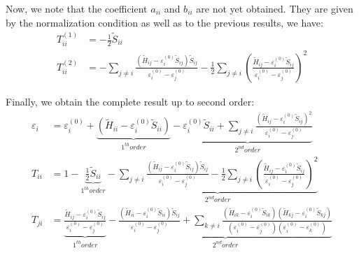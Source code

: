 \documentclass{article}
\newcommand{\order}[2]{#1^{(#2)}}
\begin{document}
Now, we note that the coefficient $a_{ii}$ and $b_{ii}$ are not yet obtained. They are given by the normalization condition as well as to the previous results, we have:
\begin{align}
    \order{T_{ii}}{1} &= - \frac{1}{2} \tilde{S}_{ii} \\ 
    \order{T_{ii}}{2} &= 
    - \sum_{j\neq i} \frac{(\tilde{H}_{ij} - \order{\varepsilon_i}{0}\tilde{S}_{ij})\tilde{S}_{ij}}{\order{\varepsilon_i}{0} - \order{\varepsilon_j}{0}}
    - \frac{1}{2} \sum_{j\neq i} \left(\frac{\tilde{H}_{ij} - \order{\varepsilon_i}{0}\tilde{S}_{ij}}{\order{\varepsilon_i}{0} - \order{\varepsilon_j}{0}} \right)^2
\end{align}

Finally, we obtain the complete result up to second order:
\begin{align}
    \varepsilon_i &= \order{\varepsilon_i}{0} + \underbrace{(\tilde{H}_{ii} - \order{\varepsilon_i}{0} \tilde{S}_{ii})}_{1^{th} order} 
    - \underbrace{\order{\varepsilon_i}{0} \tilde{S}_{ii} + \sum_{j\neq i} \frac{(\tilde{H}_{ij}- \order{\varepsilon_i}{0} \tilde{S}_{ij})^2}{\order{\varepsilon_i}{0} - \order{\varepsilon_j}{0}} }_{2^{nd} order}  \\ 
    T_{ii} &= 1 - \underbrace{\frac{1}{2} \tilde{S}_{ii}}_{1^{th} order} - \underbrace{\sum_{j\neq i} \frac{(\tilde{H}_{ij} - \order{\varepsilon_i}{0}\tilde{S}_{ij})\tilde{S}_{ij}}{\order{\varepsilon_i}{0} - \order{\varepsilon_j}{0}}
    - \frac{1}{2} \sum_{j\neq i} \left(\frac{\tilde{H}_{ij} - \order{\varepsilon_i}{0}\tilde{S}_{ij}}{\order{\varepsilon_i}{0} - \order{\varepsilon_j}{0}} \right)^2}_{2^{nd} order} \\ 
    T_{ji} &= \underbrace{\frac{\tilde{H}_{ij}- \order{\varepsilon_i}{0} \tilde{S}_{ij}}{\order{\varepsilon_i}{0} - \order{\varepsilon_j}{0}} }_{1^{th} order}
    - \underbrace{\frac{(\tilde{H}_{ii}- \order{\varepsilon_i}{0}\tilde{S}_{ii} )\tilde{S}_{ij}}{\order{\varepsilon_i}{0} - \order{\varepsilon_j}{0}}
    + \sum_{k\neq i} \frac{(\tilde{H}_{ik}- \order{\varepsilon_i}{0} \tilde{S}_{ik})(\tilde{H}_{kj}- \order{\varepsilon_i}{0} \tilde{S}_{kj})}{(\order{\varepsilon_i}{0} - \order{\varepsilon_j}{0})(\order{\varepsilon_i}{0} - \order{\varepsilon_k}{0})} }_{2^{nd} order}
\end{align}
\end{document}
